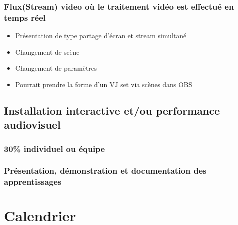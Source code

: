\documentclass[
]{book}
\providecommand{\tightlist}{%
  \setlength{\itemsep}{0pt}\setlength{\parskip}{0pt}}
\begin{document}
\hypertarget{fluxstream-video-ouxf9-le-traitement-viduxe9o-est-effectuuxe9-en-temps-ruxe9el}{%
\subsection{Flux(Stream) video où le traitement vidéo est effectué en temps réel}\label{fluxstream-video-ouxf9-le-traitement-viduxe9o-est-effectuuxe9-en-temps-ruxe9el}}

\begin{itemize}
\tightlist
\item
  Présentation de type partage d'écran et stream simultané
\item
  Changement de scène
\item
  Changement de paramètres
\item
  Pourrait prendre la forme d'un VJ set via scènes dans OBS
\end{itemize}

\hypertarget{evaluation_6}{%
\section{Installation interactive et/ou performance audiovisuel}\label{evaluation_6}}

\hypertarget{individuel-ou-uxe9quipe}{%
\subsection{30\% individuel ou équipe}\label{individuel-ou-uxe9quipe}}

\hypertarget{pruxe9sentation-duxe9monstration-et-documentation-des-apprentissages}{%
\subsection{Présentation, démonstration et documentation des apprentissages}\label{pruxe9sentation-duxe9monstration-et-documentation-des-apprentissages}}

\hypertarget{calendrier}{%
\chapter{Calendrier}\label{calendrier}}
\end{document}
